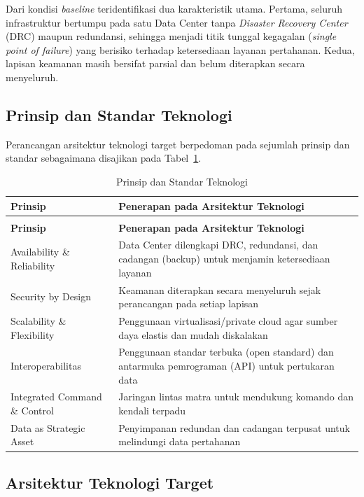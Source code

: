 Dari kondisi \textit{baseline} teridentifikasi dua karakteristik utama. Pertama, seluruh infrastruktur bertumpu pada satu Data Center tanpa \textit{Disaster Recovery Center} (DRC) maupun redundansi, sehingga menjadi titik tunggal kegagalan (\textit{single point of failure}) yang berisiko terhadap ketersediaan layanan pertahanan. Kedua, lapisan keamanan masih bersifat parsial dan belum diterapkan secara menyeluruh.

\subsection{Prinsip dan Standar Teknologi}

Perancangan arsitektur teknologi target berpedoman pada sejumlah prinsip dan standar sebagaimana disajikan pada Tabel~\ref{tab:d4-23}.

\begin{longtable}{@{}>{\raggedright\arraybackslash}p{}>{\raggedright\arraybackslash}p{}@{}}
\caption{Prinsip dan Standar Teknologi}
\label{tab:d4-23}\\
\toprule
\textbf{Prinsip} & \textbf{Penerapan pada Arsitektur Teknologi}\\
\midrule
\endfirsthead
\multicolumn{2}{@{}l}{\small\itshape \tablename\ \thetable{} (lanjutan)}\\
\toprule
\textbf{Prinsip} & \textbf{Penerapan pada Arsitektur Teknologi}\\
\midrule
\endhead
\bottomrule
\endlastfoot
Availability \& Reliability & Data Center dilengkapi DRC, redundansi, dan cadangan (backup) untuk menjamin ketersediaan layanan\\
Security by Design & Keamanan diterapkan secara menyeluruh sejak perancangan pada setiap lapisan\\
Scalability \& Flexibility & Penggunaan virtualisasi/private cloud agar sumber daya elastis dan mudah diskalakan\\
Interoperabilitas & Penggunaan standar terbuka (open standard) dan antarmuka pemrograman (API) untuk pertukaran data\\
Integrated Command \& Control & Jaringan lintas matra untuk mendukung komando dan kendali terpadu\\
Data as Strategic Asset & Penyimpanan redundan dan cadangan terpusat untuk melindungi data pertahanan\\
\end{longtable}

\subsection{Arsitektur Teknologi Target}

